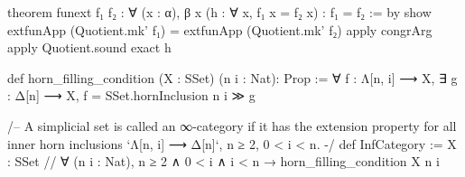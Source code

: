 \documentclass{article}
\begin{document}
\begin{leancode}
theorem funext {f₁ f₂ : ∀ (x : α), β x} (h : ∀ x, f₁ x = f₂ x) : f₁ = f₂ := by
  show extfunApp (Quotient.mk' f₁) = extfunApp (Quotient.mk' f₂)
  apply congrArg
  apply Quotient.sound
  exact h
\end{leancode}

\begin{leancode}
  def horn_filling_condition (X : SSet) (n i : Nat): Prop :=
    ∀ f : Λ[n, i] ⟶ X, ∃ g : Δ[n] ⟶ X,
    f = SSet.hornInclusion n i ≫ g
  
  /-- A simplicial set is called an ∞-category if it has the extension property
  for all inner horn inclusions `Λ[n, i] ⟶ Δ[n]`, n ≥ 2, 0 < i < n. -/
  def InfCategory := {X : SSet //
    ∀ (n i : Nat), n ≥ 2 ∧ 0 < i ∧ i < n → horn_filling_condition X n i}
\end{leancode}
\end{document}
